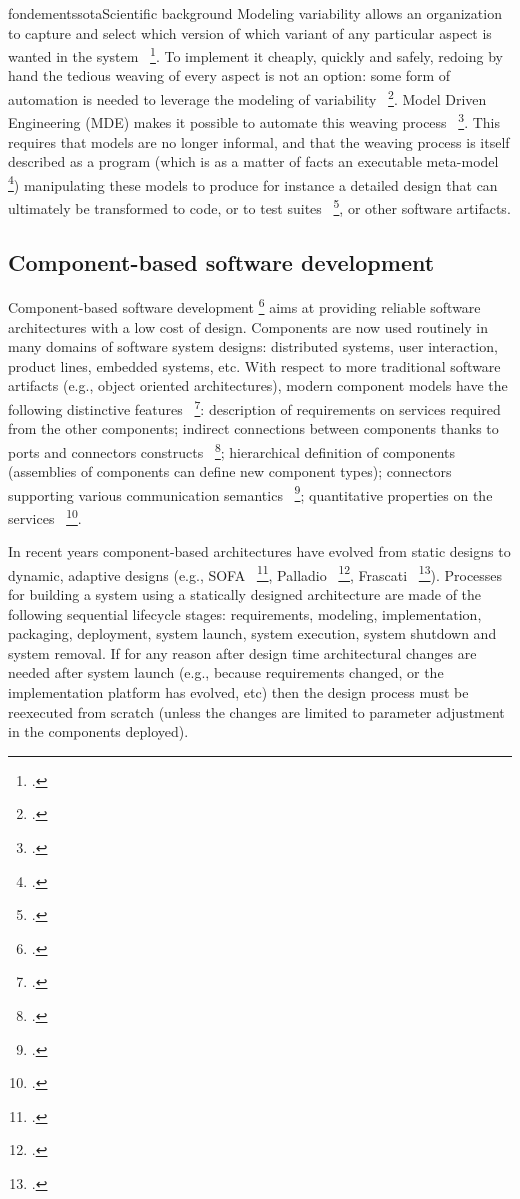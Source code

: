 \documentclass{ra2018}
\begin{document}
\begin{module}{fondements}{sota}{Scientific background}
Modeling variability allows an organization to capture and select which
version of which variant of any particular aspect is wanted in the
system~  \footcite{Bosch2002}. To implement it cheaply, quickly and safely, redoing by hand
the tedious weaving of every aspect is not an option: some form of automation
is needed to leverage the modeling of
variability~  \footcite{batory2002,czarnecki2000}. Model Driven Engineering (MDE)
makes it possible to automate this weaving process~  \footcite{Jezequel08a}. This
requires that models are no longer informal, and that the weaving process is
itself described as a program (which is as a matter of facts an executable
meta-model~  \footcite{Muller05a}) manipulating these models to produce for instance a
detailed design that can ultimately be transformed to code, or to test
suites~  \footcite{Pickin07a}, or other software artifacts.


\subsection{Component-based software development}

Component-based software development   \footcite{szyperski2002component} aims at providing reliable software architectures with a low cost of design.
Components are now used routinely in many domains of software system designs: 
distributed systems, user interaction, product lines, embedded systems, etc.
With respect to more traditional software artifacts (e.g., object oriented architectures),
modern component models have the following distinctive features~  \footcite{crnkovic2011classification}: 
description of requirements on services required from the other components;
indirect connections between components thanks to ports and connectors constructs~  \footcite{lau2005exogenous};
hierarchical definition of components (assemblies of components can define new component types);
connectors supporting various communication semantics~  \footcite{bures2006sofa};
quantitative properties on the services~  \footcite{beugnard2010contract}.

In recent years  component-based architectures have evolved from static designs to dynamic, adaptive designs (e.g., SOFA~  \footcite{bures2006sofa}, Palladio~  \footcite{Becker:2009cl}, Frascati~  \footcite{Melisson:2010it}).
Processes for building a system using a statically designed architecture are made of  the following sequential lifecycle stages: requirements, modeling, implementation, packaging, deployment, system launch, system execution, system shutdown and system removal.
If for any reason after design time architectural changes are needed after system launch (e.g., because requirements changed, or the implementation platform has evolved, etc) then the design process must be reexecuted from scratch 
(unless the changes are limited to parameter adjustment in the components deployed).


\end{module}
\end{document}
